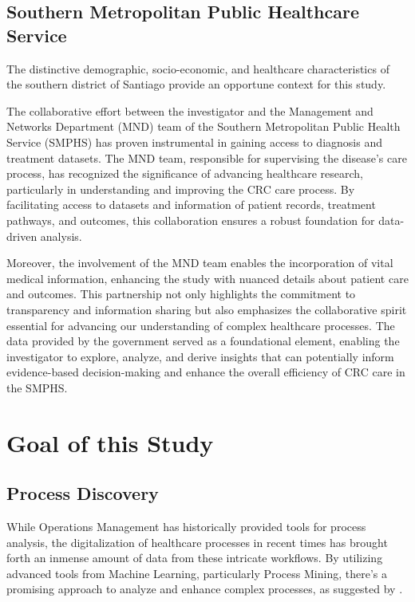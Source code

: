 \subsection*{Southern Metropolitan Public Healthcare Service}

The distinctive demographic, socio-economic, and healthcare characteristics of the southern district of Santiago provide an opportune context for this study. 

The collaborative effort between the investigator and the Management and Networks Department (MND) team of the Southern Metropolitan Public Health Service (SMPHS) has proven instrumental in gaining access to diagnosis and treatment datasets. The MND team, responsible for supervising the disease's care process, has recognized the significance of advancing healthcare research, particularly in understanding and improving the CRC care process. By facilitating access to datasets and information of patient records, treatment pathways, and outcomes, this collaboration ensures a robust foundation for data-driven analysis.

Moreover, the involvement of the MND team enables the incorporation of vital medical information, enhancing the study with nuanced details about patient care and outcomes. This partnership not only highlights the commitment to transparency and information sharing but also emphasizes the collaborative spirit essential for advancing our understanding of complex healthcare processes. The data provided by the government served as a foundational element, enabling the investigator to explore, analyze, and derive insights that can potentially inform evidence-based decision-making and enhance the overall efficiency of CRC care in the SMPHS.

\section{Goal of this Study}
\subsection*{Process Discovery}

While Operations Management has historically provided tools for process analysis, the digitalization of healthcare processes in recent times has brought forth an inmense amount of data from these intricate workflows. By utilizing advanced tools from Machine Learning, particularly Process Mining, there's a promising approach to analyze and enhance complex processes, as suggested by .

